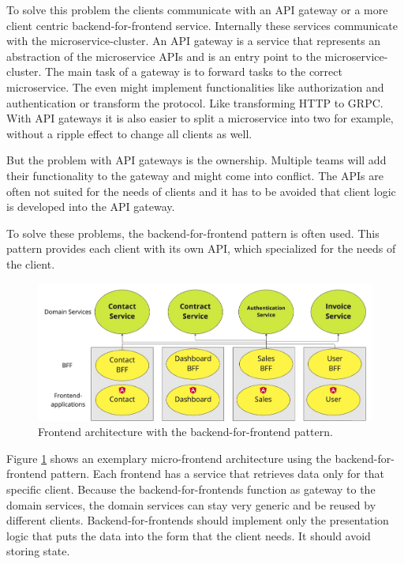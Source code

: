 To solve this problem the clients communicate with an API gateway or a more client centric backend-for-frontend service. Internally these services communicate with the microservice-cluster. An API gateway is a service that represents an abstraction of the microservice APIs and is an entry point to the microservice-cluster. The main task of a gateway is to forward tasks to the correct microservice. The even might implement functionalities like authorization and authentication or transform the protocol. Like transforming HTTP to GRPC. With API gateways it is also easier to split a microservice into two for example, without a ripple effect to change all clients as well.

But the problem with API gateways is the ownership. Multiple teams will add their functionality to the gateway and might come into conflict. The APIs are often not suited for the needs of clients and it has to be avoided that client logic is developed into the API gateway.

\fi

To solve these problems, the backend-for-frontend pattern is often used. This pattern provides each client with its own API, which specialized for the needs of the client. \cite{book:2018:richardson:microservices-patterns}

\ifshowImages
\begin{figure}[H]
\centering
\includegraphics[width=0.8\linewidth]{images/ui-bff-architecture.jpeg}
\caption{Frontend architecture with the backend-for-frontend pattern.}\label{figure:state-of-the-art:ui-bff-architecture}
\end{figure}
\fi

Figure \ref{figure:state-of-the-art:ui-bff-architecture} shows an exemplary micro-frontend architecture using the backend-for-frontend pattern. Each frontend has a service that retrieves data only for that specific client. Because the backend-for-frontends function as gateway to the domain services, the domain services can stay very generic and be reused by different clients. Backend-for-frontends should implement only the presentation logic that puts the data into the form that the client needs. It should avoid storing state. \cite{misc:2019:leitner:backend-for-frontends}

